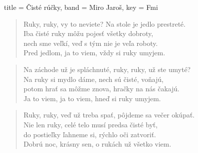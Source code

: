 \begin{song}[
        remember-chords = true ,
        verse/numbered = true ,
        transpose-capo = true 
        ]{
        title = Čisté rúčky,
        band = Miro Jaroš,
        key  = Fmi
      }
        \begin{verse}
        Ruky, ruky, vy to neviete? Na stole je jedlo prestreté. \\
        Iba čisté ruky môžu pojesť všetky dobroty, \\
        nech sme veľkí, veď s tým nie je veľa roboty. \\
        Pred jedlom, ja to viem, vždy si ruky umyjem.
        \end{verse}
        
        \begin{verse}
        Na záchode už je spláchnuté, ruky, ruky, už ste umyté? \\
        Na ruky si mydlo dáme, nech sú čisté, voňajú, \\
        potom hrať sa môžme znova, hračky na nás čakajú. \\
        Ja to viem, ja to viem, hneď si ruky umyjem.
        \end{verse}
        
        \begin{verse}
        Ruky, ruky, veď už treba spať, pôjdeme sa večer okúpať. \\
        Nie len ruky, celé telo musí predsa čisté byť, \\
        do postieľky ľahneme si, rýchlo oči zatvoriť. \\
        Dobrú noc, krásny sen, o rukách už všetko viem.
        \end{verse}
        
\end{song}